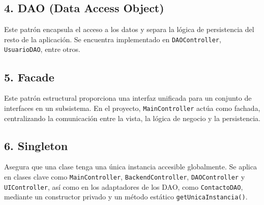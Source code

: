 \subsection*{4. DAO (Data Access Object)}
Este patrón encapsula el acceso a los datos y separa la lógica de persistencia del resto de la aplicación. 
Se encuentra implementado en \texttt{DAOController}, \texttt{UsuarioDAO}, entre otros.

\subsection*{5. Facade}
Este patrón estructural proporciona una interfaz unificada para un conjunto de interfaces en un subsistema. 
En el proyecto, \texttt{MainController} actúa como fachada, centralizando la comunicación entre la vista, la lógica de negocio y la persistencia.

\subsection*{6. Singleton}
Asegura que una clase tenga una única instancia accesible globalmente.
Se aplica en clases clave como \texttt{MainController}, \texttt{BackendController}, \texttt{DAOController} y \texttt{UIController},
así como en los adaptadores de los DAO, como \texttt{ContactoDAO}, mediante un constructor privado y un método estático \texttt{getUnicaInstancia()}.

\newpage
